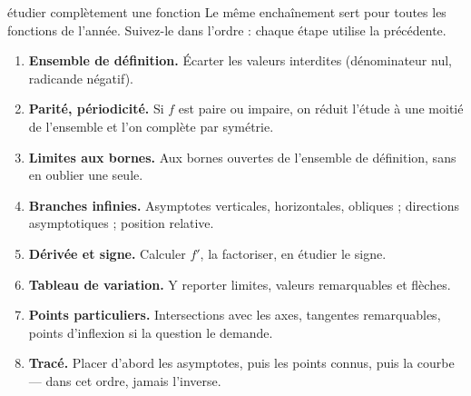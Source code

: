 \begin{methode}{étudier complètement une fonction}
Le même enchaînement sert pour toutes les fonctions de l'année. Suivez-le dans
l'ordre : chaque étape utilise la précédente.

\begin{enumerate}[label=\textbf{\arabic*.}, leftmargin=*, itemsep=0.28em]
  \item \textbf{Ensemble de définition.} Écarter les valeurs interdites
        (dénominateur nul, radicande négatif).
  \item \textbf{Parité, périodicité.} Si $f$ est paire ou impaire, on réduit
        l'étude à une moitié de l'ensemble et l'on complète par symétrie.
  \item \textbf{Limites aux bornes.} Aux bornes ouvertes de l'ensemble de
        définition, sans en oublier une seule.
  \item \textbf{Branches infinies.} Asymptotes verticales, horizontales,
        obliques ; directions asymptotiques ; position relative.
  \item \textbf{Dérivée et signe.} Calculer $f'$, la factoriser, en étudier le
        signe.
  \item \textbf{Tableau de variation.} Y reporter limites, valeurs
        remarquables et flèches.
  \item \textbf{Points particuliers.} Intersections avec les axes, tangentes
        remarquables, points d'inflexion si la question le demande.
  \item \textbf{Tracé.} Placer d'abord les asymptotes, puis les points connus,
        puis la courbe — dans cet ordre, jamais l'inverse.
\end{enumerate}
\end{methode}

